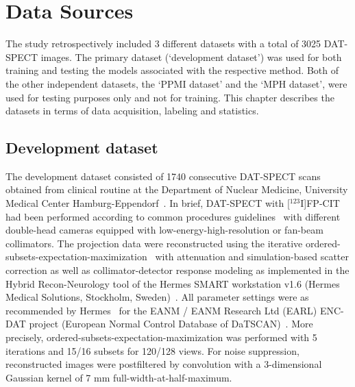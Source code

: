 \section{Data Sources}
\label{sec:data}

The study retrospectively included 3 different datasets with a total of 3025 DAT-SPECT images.
The primary dataset (`development dataset') was used for both training and testing the models associated with the respective method. 
Both of the other independent datasets, the `PPMI dataset' and the `MPH dataset', 
were used for testing purposes only and not for training.
This chapter describes the datasets in terms of data acquisition, labeling and statistics.

\subsection{Development dataset}
\label{subsec:spect_dataset}

The development dataset consisted of 1740 consecutive DAT-SPECT scans obtained from clinical routine at 
the Department of Nuclear Medicine, University Medical Center Hamburg-Eppendorf~\citep{Schiebler2023}.
In brief, DAT-SPECT with [$^{123}$I]FP-CIT had been performed according to common procedures guidelines~\citep{Darcourt2010-ar, Djang2012-ow} 
with different double-head cameras equipped with low-energy-high-resolution or fan-beam collimators. 
The projection data were reconstructed using the iterative ordered-subsets-expectation-maximization~\citep{Hudson1994} 
with attenuation and simulation-based scatter correction 
as well as collimator-detector response modeling as implemented in the Hybrid Recon-Neurology tool 
of the Hermes SMART workstation v1.6 (Hermes Medical Solutions, Stockholm, Sweden)~\citep{Diemling2021-mg, Sohlberg2012-ep, HybridRecon, Kangasmaa2016-aw}.
All parameter settings were as recommended by Hermes~\citep{Diemling2021-mg} for the EANM / EANM Research Ltd (EARL) ENC-DAT project (European Normal Control Database of DaTSCAN)~\citep{Tossici-Bolt2011-cx, Dickson2010-fm, Varrone2013-it, Tossici-Bolt2017-xj, Dickson2012-hk}.
More precisely, ordered-subsets-expectation-maximization was performed with 5 iterations and 15/16 subsets for 120/128 views. 
For noise suppression, reconstructed images were postfiltered by convolution with a 3-dimensional Gaussian kernel of 7 mm full-width-at-half-maximum. 

